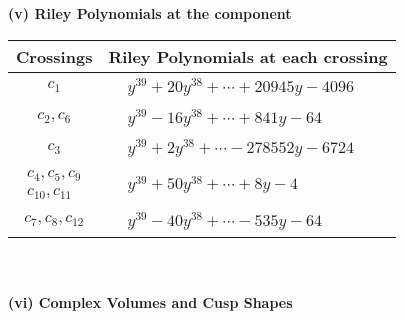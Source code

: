 \documentclass[1p]{elsarticle_modified}
\theoremstyle{definition}
\begin{document}
\newpage\renewcommand{\arraystretch}{1}
\flushleft \textbf{(v) Riley Polynomials at the component}\newline \\
\begin{tabular}{m{50pt}|m{274pt}}
Crossings & \hspace{64pt}Riley Polynomials at each crossing \\
\hline $$\begin{aligned}c_{1}\end{aligned}$$&$\begin{aligned}
&y^{39}+20 y^{38}+\cdots+20945 y-4096
\end{aligned}$\\
\hline $$\begin{aligned}c_{2},c_{6}\end{aligned}$$&$\begin{aligned}
&y^{39}-16 y^{38}+\cdots+841 y-64
\end{aligned}$\\
\hline $$\begin{aligned}c_{3}\end{aligned}$$&$\begin{aligned}
&y^{39}+2 y^{38}+\cdots-278552 y-6724
\end{aligned}$\\
\hline $$\begin{aligned}c_{4},c_{5},c_{9}\\c_{10},c_{11}\end{aligned}$$&$\begin{aligned}
&y^{39}+50 y^{38}+\cdots+8 y-4
\end{aligned}$\\
\hline $$\begin{aligned}c_{7},c_{8},c_{12}\end{aligned}$$&$\begin{aligned}
&y^{39}-40 y^{38}+\cdots-535 y-64
\end{aligned}$\\
\hline
\end{tabular}\\~\\
\newpage\flushleft \textbf{(vi) Complex Volumes and Cusp Shapes}
\end{document}
